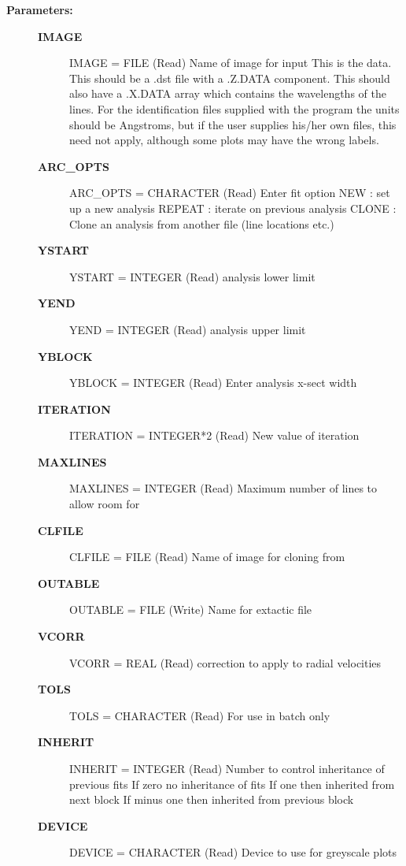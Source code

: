 \begin{description}
\begin{description}
\item [\textbf{Parameters:}]
\begin{description}
\item [\textbf{IMAGE}]
   IMAGE = FILE (Read)
        Name of image for input
                This is the data. This should be a .dst file with
                a .Z.DATA component. This should also have a .X.DATA
                array which contains the wavelengths of the lines.
                For the identification files supplied with the program
                the units should be Angstroms, but if the user supplies
                his/her own files, this need not apply, although some
                plots may have the wrong labels.
\item [\textbf{ARC\_OPTS}]
   ARC\_OPTS = CHARACTER (Read)
        Enter fit option
                 NEW    : set up a new analysis
                 REPEAT : iterate on previous analysis
                 CLONE  : Clone an analysis from another file
                          (line locations etc.)
\item [\textbf{YSTART}]
   YSTART = INTEGER (Read)
        analysis lower limit
\item [\textbf{YEND}]
   YEND = INTEGER (Read)
        analysis upper limit
\item [\textbf{YBLOCK}]
   YBLOCK = INTEGER (Read)
        Enter analysis x-sect width
\item [\textbf{ITERATION}]
   ITERATION = INTEGER*2 (Read)
        New value of iteration
\item [\textbf{MAXLINES}]
   MAXLINES = INTEGER (Read)
        Maximum number of lines to allow room for
\item [\textbf{CLFILE}]
   CLFILE = FILE (Read)
        Name of image for cloning from
\item [\textbf{OUTABLE}]
   OUTABLE = FILE (Write)
        Name for extactic file
\item [\textbf{VCORR}]
   VCORR = REAL (Read)
        correction to apply to radial velocities
\item [\textbf{TOLS}]
   TOLS = CHARACTER (Read)
        For use in batch only
\item [\textbf{INHERIT}]
   INHERIT = INTEGER (Read)
        Number to control inheritance of  previous fits
                 If zero no inheritance of fits
                 If one then inherited from next block
                 If minus one then inherited from previous block
\item [\textbf{DEVICE}]
   DEVICE = CHARACTER (Read)
        Device to use for greyscale plots

\end{description}
\end{description}
\end{description}
